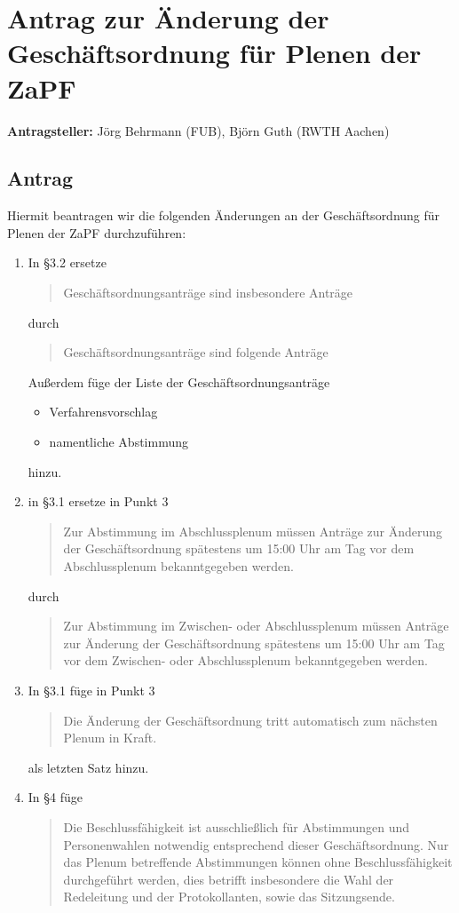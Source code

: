 \documentclass[draft,12pt,oneside]{scrartcl}
\begin{document}
\section*{Antrag zur Änderung der Geschäftsordnung für Plenen der ZaPF}

\textbf{Antragsteller:} Jörg Behrmann (FUB), Björn Guth (RWTH Aachen)

\subsection*{Antrag}

Hiermit beantragen wir die folgenden Änderungen an der Geschäftsordnung für Plenen der ZaPF durchzuführen:
\begin{enumerate}
	\item In §3.2 ersetze
		\begin{quote}
			Geschäftsordnungsanträge sind insbesondere Anträge
		\end{quote}
		durch
		\begin{quote}
			Geschäftsordnungsanträge sind folgende Anträge
		\end{quote}
		Außerdem füge der Liste der Geschäftsordnungsanträge
		\begin{itemize}
			\item Verfahrensvorschlag
			\item namentliche Abstimmung
		\end{itemize}
		hinzu.
	\item in §3.1 ersetze in Punkt 3
		\begin{quote}
			Zur Abstimmung im Abschlussplenum müssen Anträge zur Änderung der Geschäftsordnung spätestens um 15:00 Uhr am Tag vor dem Abschlussplenum bekanntgegeben werden.
		\end{quote}
		durch
		\begin{quote}
			Zur Abstimmung im Zwischen- oder Abschlussplenum müssen Anträge zur Änderung der Geschäftsordnung spätestens um 15:00 Uhr am Tag vor dem Zwischen- oder Abschlussplenum bekanntgegeben werden.
		\end{quote}
	\item In §3.1 füge in Punkt 3
		\begin{quote}
			Die Änderung der Geschäftsordnung tritt automatisch zum nächsten Plenum in Kraft.
		\end{quote}
		als letzten Satz hinzu.
	\item In §4 füge
		\begin{quote}
			Die Beschlussfähigkeit ist ausschließlich für Abstimmungen und Personenwahlen notwendig entsprechend dieser Geschäftsordnung. Nur das Plenum betreffende Abstimmungen können ohne Beschlussfähigkeit durchgeführt werden, dies betrifft insbesondere die Wahl der Redeleitung und der Protokollanten, sowie das Sitzungsende.

\end{quote}
\end{enumerate}
\end{document}
